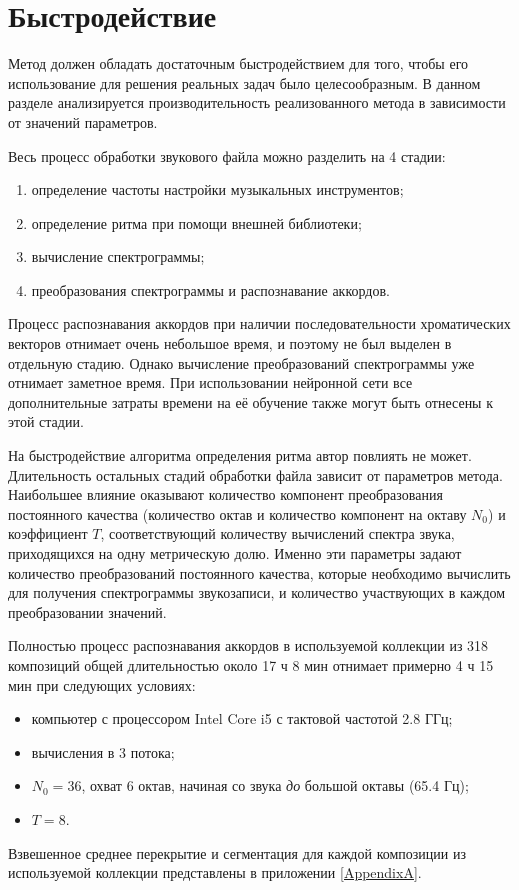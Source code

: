 \section{Быстродействие} \label{sect3_time}

Метод должен обладать достаточным быстродействием для того, чтобы его
использование для решения реальных задач было целесообразным. В данном разделе
анализируется производительность реализованного метода в зависимости от значений
параметров.

Весь процесс обработки звукового файла можно разделить на 4 стадии:
\begin{enumerate}
  \item определение частоты настройки музыкальных инструментов;
  \item определение ритма при помощи внешней библиотеки;
  \item вычисление спектрограммы;
  \item преобразования спектрограммы и распознавание аккордов.
\end{enumerate}

Процесс распознавания аккордов при наличии последовательности хроматических
векторов отнимает очень небольшое время, и поэтому не был выделен в отдельную
стадию. Однако вычисление преобразований спектрограммы уже отнимает заметное
время. При использовании нейронной сети все дополнительные затраты времени на её
обучение также могут быть отнесены к этой стадии.

На быстродействие алгоритма определения ритма автор повлиять не может.
Длительность остальных стадий обработки файла зависит от параметров метода.
Наибольшее влияние оказывают количество компонент преобразования постоянного
качества (количество октав и количество компонент на октаву $N_0$) и
коэффициент $T$, соответствующий количеству вычислений спектра звука,
приходящихся на одну метрическую долю. Именно эти параметры задают количество
преобразований постоянного качества, которые необходимо вычислить для получения
спектрограммы звукозаписи, и количество участвующих в каждом преобразовании
значений.

Полностью процесс распознавания аккордов в используемой коллекции из 318
композиций общей длительностью около 17 ч 8 мин отнимает примерно 4 ч 15 мин при
следующих условиях:
\begin{itemize}
  \item компьютер с процессором Intel Core i5 с тактовой частотой 2.8 ГГц;
  \item вычисления в 3 потока;
  \item $N_0=36$, охват 6 октав, начиная со звука \emph{до} большой октавы
  (65.4 Гц);
  \item $T=8$.
\end{itemize}
Взвешенное среднее перекрытие и сегментация для каждой композиции из
используемой коллекции представлены в приложении \ref{AppendixA}.

